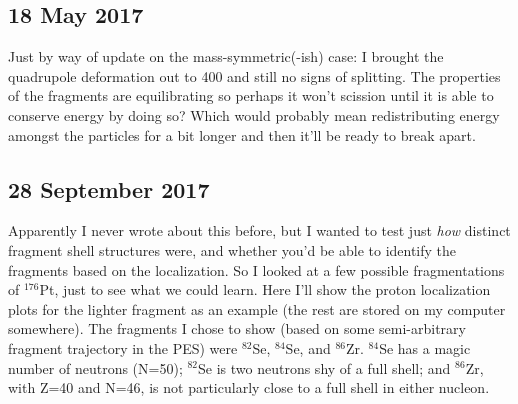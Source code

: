\documentclass[]{report}
\begin{document}
\subsection*{18 May 2017}

Just by way of update on the mass-symmetric(-ish) case: I brought the quadrupole deformation out to 400 and still no signs of splitting. The properties of the fragments are equilibrating so perhaps it won't scission until it is able to conserve energy by doing so? Which would probably mean redistributing energy amongst the particles for a bit longer and then it'll be ready to break apart.

\subsection*{28 September 2017}

Apparently I never wrote about this before, but I wanted to test just \textit{how} distinct fragment shell structures were, and whether you'd be able to identify the fragments based on the localization. So I looked at a few possible fragmentations of $^{176}$Pt, just to see what we could learn. Here I'll show the proton localization plots for the lighter fragment as an example (the rest are stored on my computer somewhere). The fragments I chose to show (based on some semi-arbitrary fragment trajectory in the PES) were $^{82}$Se, $^{84}$Se, and $^{86}$Zr. $^{84}$Se has a magic number of neutrons (N=50); $^{82}$Se is two neutrons shy of a full shell; and $^{86}$Zr, with Z=40 and N=46, is not particularly close to a full shell in either nucleon.
\end{document}
